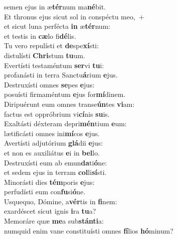 \oddverse semen ejus in æ\textbf{tér}num ma\textbf{né}bit.\\
\evenverse Et thronus ejus sicut sol in conspéctu meo,~+\\
\evenverse  et sicut luna perfécta \textbf{in} æ\textbf{tér}num:~\*\\
\evenverse et testis in \textbf{cæ}lo fi\textbf{dé}lis.\\
\oddverse Tu vero repulísti et \textbf{de}spe\textbf{xí}sti:~\*\\
\oddverse distulísti \textbf{Chri}stum \textbf{tu}um.\\
\evenverse Evertísti testaméntum \textbf{ser}vi \textbf{tu}i:~\*\\
\evenverse profanásti in terra Sanctu\textbf{á}rium \textbf{e}jus.\\
\oddverse Destruxísti omnes \textbf{se}pes \textbf{e}jus:~\*\\
\oddverse posuísti firmaméntum \textbf{e}jus for\textbf{mí}dinem.\\
\evenverse Diripuérunt eum omnes transe\textbf{ún}tes \textbf{vi}am:~\*\\
\evenverse factus est oppróbrium vi\textbf{cí}nis \textbf{su}is.\\
\oddverse Exaltásti déxteram depri\textbf{mén}tium \textbf{e}um:~\*\\
\oddverse lætificásti omnes ini\textbf{mí}cos \textbf{e}jus.\\
\evenverse Avertísti adjutórium \textbf{glá}dii \textbf{e}jus:~\*\\
\evenverse et non es auxiliátus \textbf{e}i in \textbf{bel}lo.\\
\oddverse Destruxísti eum ab emun\textbf{da}ti\textbf{ó}ne:~\*\\
\oddverse et sedem ejus in terram \textbf{col}li\textbf{sí}sti.\\
\evenverse Minorásti dies \textbf{tém}poris \textbf{e}jus:~\*\\
\evenverse perfudísti eum con\textbf{fu}si\textbf{ó}ne.\\
\oddverse Usquequo, Dómine, a\textbf{vér}tis in \textbf{fi}nem:~\*\\
\oddverse exardéscet sicut ignis \textbf{i}ra \textbf{tu}a?\\
\evenverse Memoráre quæ \textbf{me}a sub\textbf{stán}\textbf{ti}a:~\*\\
\evenverse numquid enim vane constituísti omnes \textbf{fí}lios \textbf{hó}minum?\\
